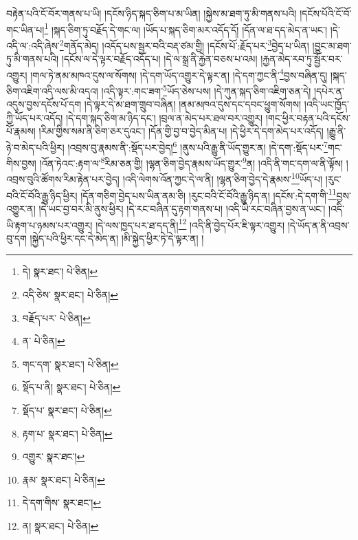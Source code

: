 བརྟེན་པའི་ངོ་བོར་གནས་པ་ཡི། །དངོས་ཉིད་སྐད་ཅིག་པ་མ་ཡིན། །སྐྱེས་མ་ཐག་ཏུ་མི་གནས་པའི། །དངོས་པོའི་ངོ་བོ་གང་ཡིན་པ།\footnote{དེ།  སྣར་ཐང་།  པེ་ཅིན། } །སྐད་ཅིག་ཏུ་བརྗོད་དེ་གང་ལ། །ཡོད་པ་སྐད་ཅིག་མར་འདོད་དོ། །དོན་ལ་ཐ་དད་མེད་ན་ཡང་། །དེ་འདི་ལ་:འདི་ཞེས་\footnote{འདི་ཅེས་  སྣར་ཐང་།  པེ་ཅིན། }གནོད་མེད། །འདོད་པས་སྦྱར་བའི་བརྡ་ཙམ་གྱི། །དངོས་པོ་:རྗོད་པར་\footnote{བརྗོད་པར་  པེ་ཅིན། }བྱེད་པ་ཡིན། །བྱུང་མ་ཐག་ཏུ་མི་གནས་པའི། །དངོས་ལ་དེ་ལྟར་བརྗོད་འདོད་པ། །དེ་ལ་སྒྲ་ནི་རྐྱེན་བཅས་པ་འམ། །རྐྱན་མེད་རབ་ཏུ་སྦྱོར་བར་འགྱུར། །གལ་ཏེ་ནམ་མཁའ་དུས་ལ་སོགས། །དེ་དག་ཡོད་འགྱུར་དེ་ལྟར་ན། །དེ་དག་ཀྱང་ནི་\footnote{ན་  པེ་ཅིན། }བྱས་བཞིན་དུ། །སྐད་ཅིག་འཇིག་འདི་ལས་མི་འདའ། །འདི་ལྟར་:གང་ཟག་\footnote{གང་དག་  སྣར་ཐང་།  པེ་ཅིན། }ཡོད་ཅེས་པས། །དེ་ཀུན་སྐད་ཅིག་འཇིག་ཅན་དེ། །དཔེར་ན་འདུས་བྱས་དངོས་པོ་དག །དེ་ལྟར་དེ་མ་ཐག་གྲུབ་བཞིན། །ནམ་མཁའ་དུས་དང་དབང་ཕྱུག་སོགས། །འདི་ཡང་ཁྱོད་ཀྱི་ཡོད་པར་འདོད། །དེ་དག་སྐད་ཅིག་མ་ཉིད་དང་། །བྲལ་ན་མེད་པར་ཐལ་བར་འགྱུར། །གང་ཕྱིར་བརྟན་པའི་དངོས་པོ་རྣམས། །རིམ་གྱིས་སམ་ནི་ཅིག་ཅར་དུའང་། །དོན་གྱི་བྱ་བ་བྱེད་མིན་པ། །དེ་ཕྱིར་དེ་དག་མེད་པར་འདོད། །རྒྱུ་ནི་ཉེ་བ་མེད་པའི་ཕྱིར། །འབྲས་བུ་རྣམས་ནི་:སྡོད་པར་བྱེད།\footnote{སྡོད་པ་ནི།  སྣར་ཐང་།  པེ་ཅིན། } །ནུས་པའི་རྒྱུ་ནི་ཡོད་གྱུར་ན། །དེ་དག་:སྡོད་པར་\footnote{སྡོད་པ་  སྣར་ཐང་།  པེ་ཅིན། }གང་གིས་བྱས། །འོན་ཏེའང་:རྟག་ལ་\footnote{རྟག་པ་  སྣར་ཐང་།  པེ་ཅིན། }རིམ་ཅན་གྱི། །ལྷན་ཅིག་བྱེད་རྣམས་ཡོད་གྱུར་\footnote{འགྱུར་  སྣར་ཐང་། }ན། །འདི་ནི་གང་དག་ལ་ནི་ལྟོས། །འབྲས་བུའི་ཚོགས་རིམ་རྟེན་པར་བྱེད། །འདི་ལེགས་འོན་ཀྱང་དེ་ལ་ནི། །ལྷན་ཅིག་བྱེད་དེ་རྣམས་\footnote{རྣམ་  སྣར་ཐང་།  པེ་ཅིན། }ཡོད་པ། །རུང་བའི་ངོ་བོའི་རྒྱུ་ཉིད་ཕྱིར། །དོན་གཅིག་བྱེད་པས་ཡིན་ནམ་ཅི། །རུང་བའི་ངོ་བོའི་རྒྱུ་ཉིད་ན། །དངོས་:དེ་དག་གི་\footnote{དེ་དག་གིས་  སྣར་ཐང་། }བྱས་འགྱུར་ན། །དེ་ཡང་བྱ་བར་མི་ནུས་ཕྱིར། །དེ་རང་བཞིན་དུ་རྟག་གནས་པ། །འདི་ཡི་རང་བཞིན་བྱས་ན་ཡང་། །འདི་ཡི་རྟག་པ་ཉམས་པར་འགྱུར། །དེ་ལས་ཁྱད་པར་ཐ་དད་ནི།\footnote{ན།  སྣར་ཐང་།  པེ་ཅིན། } །འདི་ནི་བྱེད་པོར་ཇི་ལྟར་འགྱུར། །དེ་ཡོད་ན་ནི་འབྲས་བུ་དག །སྐྱེད་པའི་ཕྱིར་དང་དེ་མེད་ན། །མི་སྐྱེད་ཕྱིར་ཏེ་དེ་ལྟར་ན། །
